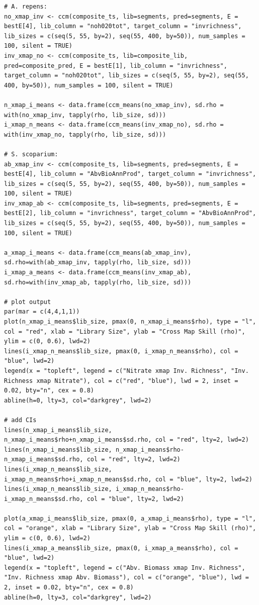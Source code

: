 \begin{lstlisting}
# A. repens:
no_xmap_inv <- ccm(composite_ts, lib=segments, pred=segments, E = bestE[4], lib_column = "noh020tot", target_column = "invrichness", lib_sizes = c(seq(5, 55, by=2), seq(55, 400, by=50)), num_samples = 100, silent = TRUE)
inv_xmap_no <- ccm(composite_ts, lib=composite_lib, pred=composite_pred, E = bestE[1], lib_column = "invrichness", target_column = "noh020tot", lib_sizes = c(seq(5, 55, by=2), seq(55, 400, by=50)), num_samples = 100, silent = TRUE)

n_xmap_i_means <- data.frame(ccm_means(no_xmap_inv), sd.rho = with(no_xmap_inv, tapply(rho, lib_size, sd)))
i_xmap_n_means <- data.frame(ccm_means(inv_xmap_no), sd.rho = with(inv_xmap_no, tapply(rho, lib_size, sd)))

# S. scoparium:
ab_xmap_inv <- ccm(composite_ts, lib=segments, pred=segments, E = bestE[4], lib_column = "AbvBioAnnProd", target_column = "invrichness", lib_sizes = c(seq(5, 55, by=2), seq(55, 400, by=50)), num_samples = 100, silent = TRUE)
inv_xmap_ab <- ccm(composite_ts, lib=segments, pred=segments, E = bestE[2], lib_column = "invrichness", target_column = "AbvBioAnnProd", lib_sizes = c(seq(5, 55, by=2), seq(55, 400, by=50)), num_samples = 100, silent = TRUE)

a_xmap_i_means <- data.frame(ccm_means(ab_xmap_inv), sd.rho=with(ab_xmap_inv, tapply(rho, lib_size, sd)))
i_xmap_a_means <- data.frame(ccm_means(inv_xmap_ab), sd.rho=with(inv_xmap_ab, tapply(rho, lib_size, sd)))

# plot output
par(mar = c(4,4,1,1))
plot(n_xmap_i_means$lib_size, pmax(0, n_xmap_i_means$rho), type = "l", col = "red", xlab = "Library Size", ylab = "Cross Map Skill (rho)", ylim = c(0, 0.6), lwd=2)
lines(i_xmap_n_means$lib_size, pmax(0, i_xmap_n_means$rho), col = "blue", lwd=2)
legend(x = "topleft", legend = c("Nitrate xmap Inv. Richness", "Inv. Richness xmap Nitrate"), col = c("red", "blue"), lwd = 2, inset = 0.02, bty="n", cex = 0.8)
abline(h=0, lty=3, col="darkgrey", lwd=2)

# add CIs
lines(n_xmap_i_means$lib_size, n_xmap_i_means$rho+n_xmap_i_means$sd.rho, col = "red", lty=2, lwd=2)
lines(n_xmap_i_means$lib_size, n_xmap_i_means$rho-n_xmap_i_means$sd.rho, col = "red", lty=2, lwd=2)
lines(i_xmap_n_means$lib_size, i_xmap_n_means$rho+i_xmap_n_means$sd.rho, col = "blue", lty=2, lwd=2)
lines(i_xmap_n_means$lib_size, i_xmap_n_means$rho-i_xmap_n_means$sd.rho, col = "blue", lty=2, lwd=2)

plot(a_xmap_i_means$lib_size, pmax(0, a_xmap_i_means$rho), type = "l", col = "orange", xlab = "Library Size", ylab = "Cross Map Skill (rho)", ylim = c(0, 0.6), lwd=2)
lines(i_xmap_a_means$lib_size, pmax(0, i_xmap_a_means$rho), col = "blue", lwd=2)
legend(x = "topleft", legend = c("Abv. Biomass xmap Inv. Richness", "Inv. Richness xmap Abv. Biomass"), col = c("orange", "blue"), lwd = 2, inset = 0.02, bty="n", cex = 0.8)
abline(h=0, lty=3, col="darkgrey", lwd=2)


\end{lstlisting}
